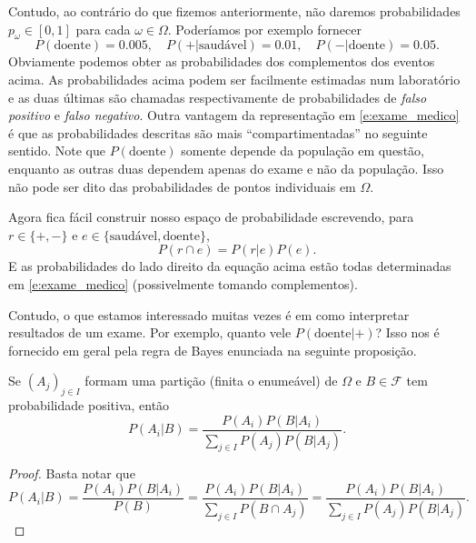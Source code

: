 \begin{topics}
Contudo, ao contrário do que fizemos anteriormente, não daremos probabilidades $p_\omega \in [0,1]$ para cada $\omega \in \Omega$.
Poderíamos por exemplo fornecer
\begin{equation}
  \label{e:exame_medico}
  P(\text{doente}) = 0.005, \quad P( + | \text{saudável}) = 0.01, \quad P( - | \text{doente}) = 0.05.
\end{equation}
Obviamente podemos obter as probabilidades dos complementos dos eventos acima.
As probabilidades acima podem ser facilmente estimadas num laboratório e as duas últimas são chamadas respectivamente de probabilidades de \emph{falso positivo} e \emph{falso negativo}.
Outra vantagem da representação em \eqref{e:exame_medico} é que as probabilidades descritas são mais ``compartimentadas'' no seguinte sentido.
Note que $P(\text{doente})$ somente depende da população em questão, enquanto as outras duas dependem apenas do exame e não da população.
Isso não pode ser dito das probabilidades de pontos individuais em $\Omega$.

Agora fica fácil construir nosso espaço de probabilidade escrevendo, para $r \in \{+, -\}$ e $e \in \{\text{saudável}, \text{doente}\}$,
\begin{equation}
  P(r \cap e) = P(r | e) P(e).
\end{equation}
E as probabilidades do lado direito da equação acima estão todas determinadas em \eqref{e:exame_medico} (possivelmente tomando complementos).

Contudo, o que estamos interessado muitas vezes é em como interpretar resultados de um exame.
Por exemplo, quanto vele $P(\text{doente} | +)$?
Isso nos é fornecido em geral pela regra de Bayes enunciada na seguinte proposição.

\begin{proposition}
  Se $(A_j)_{j\in I}$ formam uma partição (finita o enumeável) de $\Omega$ e $B \in \mathcal{F}$ tem probabilidade positiva, então
  \begin{equation}
    P(A_i | B) = \frac{P(A_i) P(B | A_i)}{\sum_{j\in I} P(A_j) P(B | A_j)}.
  \end{equation}
\end{proposition}

\begin{proof}
  Basta notar que
  \begin{equation}
    P(A_i | B) = \frac{P(A_i) P(B | A_i)}{P(B)} = \frac{P(A_i) P(B | A_i)}{\sum_{j\in I} P(B \cap A_j)} = \frac{P(A_i) P(B | A_i)}{\sum_{j\in I} P(A_j) P(B | A_j)}.
  \end{equation}
\end{proof}


\end{topics}

